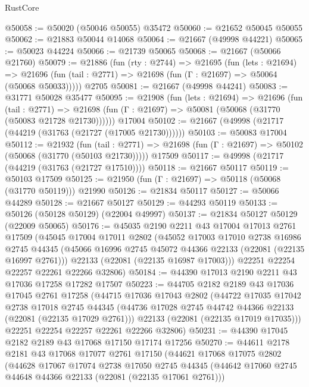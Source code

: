 \begin{lexlean}{RustCore}
\begin{coremodule}
@50058 := @50020 (@50046 @50055) @35472
@50060 := @21652 @50045 @50055
@50062 := @21883 @50044 @14068
@50064 := @21667 (@49998 @44221)
@50065 := @50023 @44224
@50066 := @21739 @50065
@50068 := @21667 (@50066 @21760)
@50079 := @21886
    (fun (rty : @2744) =>
    @21695
      (fun (lets : @21694) =>
      @21696 (fun (tail : @2771) => @21698 (fun (Γ : @21697) => @50064 (@50068 @50033)))))
    @2705
@50081 := @21667 (@49998 @44241)
@50083 := @31771 @50028 @35477
@50095 := @21908
    (fun (lets : @21694) =>
    @21696
      (fun (tail : @2771) =>
      @21698 (fun (Γ : @21697) => @50081 (@50068 (@31770 (@50083 @21728 @21730))))))
    @17004
@50102 := @21667 (@49998 (@21717 (@44219 (@31763 (@21727 (@17005 @21730))))))
@50103 := @50083 @17004
@50112 := @21932
    (fun (tail : @2771) => @21698 (fun (Γ : @21697) => @50102 (@50068 (@31770 (@50103 @21730)))))
    @17509
@50117 := @49998 (@21717 (@44219 (@31763 (@21727 @17510))))
@50118 := @21667 @50117
@50119 := @50103 @17509
@50125 := @21950 (fun (Γ : @21697) => @50118 (@50068 (@31770 @50119))) @21990
@50126 := @21834 @50117
@50127 := @50066 @44289
@50128 := @21667 @50127
@50129 := @44293 @50119
@50133 := @50126 (@50128 @50129) (@22004 @49997)
@50137 := @21834 @50127 @50129 (@22009 @50065)
@50176 := @45035
    @2190
    @2211
    @43
    @17004
    @17013
    @2761
    @17509
    (@45045
      @17004
      @17011
      @2802
      (@45052
        @17003
        @17010
        @2738
        @16986
        @2745
        @44345
        (@45066 @16996 @2745 @45072 @44366 @22133 (@22081 (@22135 @16997 @2761)))
        @22133
        (@22081 (@22135 @16987 @17003)))
      @22251
      @22254
      @22257
      @22261
      @22266
      @32806)
@50184 := @44390 @17013 @2190 @2211 @43 @17036 @17258 @17282 @17507
@50223 := @44705
    @2182
    @2189
    @43
    @17036
    @17045
    @2761
    @17258
    (@44715
      @17036
      @17043
      @2802
      (@44722
        @17035
        @17042
        @2738
        @17018
        @2745
        @44345
        (@44736 @17028 @2745 @44742 @44366 @22133 (@22081 (@22135 @17029 @2761)))
        @22133
        (@22081 (@22135 @17019 @17035)))
      @22251
      @22254
      @22257
      @22261
      @22266
      @32806)
@50231 := @44390 @17045 @2182 @2189 @43 @17068 @17150 @17174 @17256
@50270 := @44611
    @2178
    @2181
    @43
    @17068
    @17077
    @2761
    @17150
    (@44621
      @17068
      @17075
      @2802
      (@44628
        @17067
        @17074
        @2738
        @17050
        @2745
        @44345
        (@44642 @17060 @2745 @44648 @44366 @22133 (@22081 (@22135 @17061 @2761)))

\end{coremodule}
\end{lexlean}
